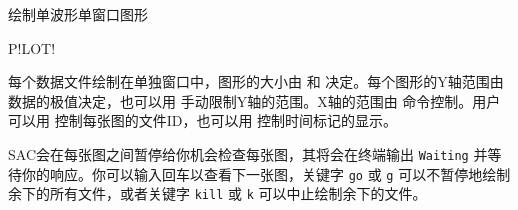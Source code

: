\label{cmd:plot}

绘制单波形单窗口图形

\begin{SACSTX}
P!LOT!
\end{SACSTX}

每个数据文件绘制在单独窗口中，图形的大小由  和
 决定。每个图形的Y轴范围由数据的极值决定，也可以用
 手动限制Y轴的范围。X轴的范围由 
命令控制。用户可以用  控制每张图的文件ID，也可以用
 控制时间标记的显示。

SAC会在每张图之间暂停给你机会检查每张图，其将会在终端输出 \texttt{Waiting}
并等待你的响应。你可以输入回车以查看下一张图，关键字 \texttt{go} 或
\texttt{g} 可以不暂停地绘制余下的所有文件，或者关键字 \texttt{kill} 或
\texttt{k} 可以中止绘制余下的文件。
